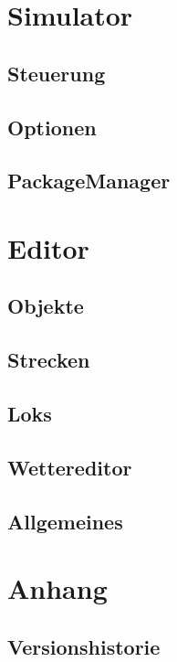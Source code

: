 \documentclass[11pt, a4paper]{refrep}
\begin{document}
\part{Simulator}
\chapter{Steuerung}

\chapter{Optionen}

\chapter{PackageManager}


\part{Editor}
\chapter{Objekte}






\chapter{Strecken}


			
\chapter{Loks}





\chapter{Wettereditor}


\chapter{Allgemeines}





\part{Anhang}
\chapter{Versionshistorie}


\end{document}
